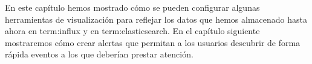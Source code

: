 En este capítulo hemos mostrado cómo se pueden configurar algunas herramientas
de visualización para reflejar los datos que hemos almacenado hasta ahora en
\gls{term:influx} y en \gls{term:elasticsearch}. En el capítulo siguiente
mostraremos cómo crear alertas que permitan a los usuarios descubrir de forma
rápida eventos a los que deberían prestar atención.
